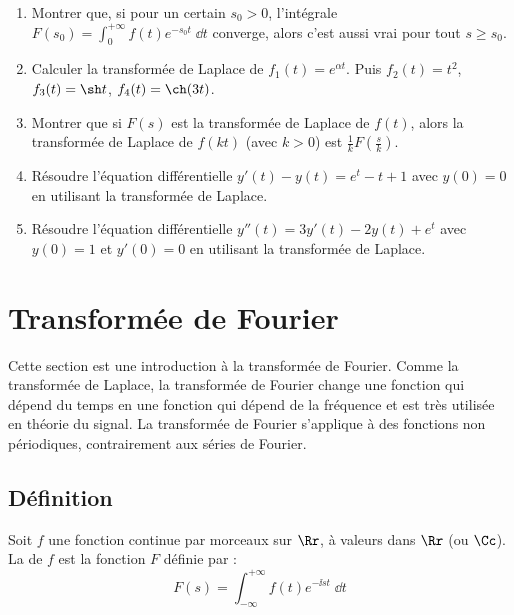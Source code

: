 \documentclass[class=report,crop=false]{standalone}
\begin{document}
\begin{miniexercices}
\begin{enumerate}
  \item Montrer que, si pour un certain $s_0>0$, l'intégrale 
  $F(s_0) = \int_0^{+\infty} f(t) e^{-s_0t}\;\dd t$ converge, alors c'est aussi vrai pour tout
  $s \ge s_0$.
  
  \item Calculer la transformée de Laplace de $f_1(t) = e^{\alpha t}$.
  Puis $f_2(t) = t^2$, $f_3(t)=\sh t$, $f_4(t)=\ch (3t)$.
  
  \item Montrer que si $F(s)$ est la transformée de Laplace de $f(t)$, alors
  la transformée de Laplace de $f(kt)$ (avec $k>0$) est
  $\frac1kF(\frac s k)$.
  
  \item Résoudre l'équation différentielle $y'(t)-y(t) = e^t-t+1$ avec $y(0)=0$ 
  en utilisant la transformée de Laplace.
  
  \item Résoudre l'équation différentielle $y''(t) = 3y'(t) -2y(t) + e^t$ avec $y(0)=1$ 
  et $y'(0)=0$  en utilisant la transformée de Laplace. 
  
\end{enumerate}
\end{miniexercices}




\section{Transformée de Fourier}

Cette section est une introduction à la transformée de Fourier.
Comme la transformée de Laplace, la transformée de Fourier change une fonction qui dépend
du temps en une fonction qui dépend de la fréquence et est très utilisée en théorie du signal.
La transformée de Fourier s'applique à des fonctions non périodiques, 
contrairement aux séries de Fourier.


\subsection{Définition}

\begin{definition}
Soit $f$ une fonction continue par morceaux sur $\Rr$, à valeurs dans $\Rr$ (ou $\Cc$).
La  de $f$ est la fonction $F$ définie par :
$$F(s) = \int_{-\infty}^{+\infty} f(t) e^{-\ii st}\;\dd t$$
\end{definition}
\end{document}
